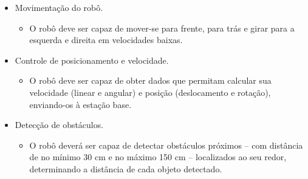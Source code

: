 \begin{itemize} %

  \item Movimentação do robô.
    \begin{itemize}
      \item O robô deve ser capaz de mover-se para frente, para trás e girar para a esquerda e direita em velocidades baixas.
    \end{itemize}

  \item Controle de posicionamento e velocidade.
    \begin{itemize}
      \item O robô deve ser capaz de obter dados que permitam calcular sua velocidade (linear e angular) e posição (deslocamento e rotação), enviando-os à estação base.
    \end{itemize}

  \item Detecção de obstáculos.
    \begin{itemize}
      \item O robô deverá ser capaz de detectar obstáculos próximos -- com distância de no mínimo 30 cm e no máximo 150 cm -- localizados ao seu redor, determinando a distância de cada objeto detectado.
    \end{itemize}

\end{itemize} %

